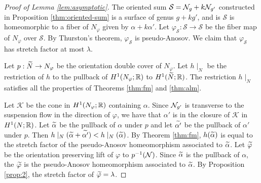 \begin{proof}[Proof of Lemma \ref{lem:asymptotic}]
The oriented sum $\mathcal{S}=\mathcal{N}_g+k\mathcal{N}_{g'}$ constructed in Proposition \ref{thm:oriented-sum} is a surface of genus $g+kg'$, and is $\mathcal{S}$ is homeomorphic to a fiber of $N_\varphi$ given by $\alpha+k\alpha'$.  Let $\varphi_{\mathcal{S}}:\mathcal{S}\rightarrow\mathcal{S}$ be the fiber map of $N_\varphi$ over $\mathcal{S}$.  By Thurston's theorem, $\varphi_{\mathcal{S}}$ is pseudo-Anosov.  We claim that $\varphi_{\mathcal{S}}$ has stretch factor at most $\lambda$.

Let $p:\widetilde{N}\rightarrow N_\varphi$ be the orientation double cover of $N_\varphi$. Let $h\mid_{N}$ be the restriction of $h$ to the pullback of $H^1(N_\varphi; \mathbb{R})$ to $H^1(\widetilde{N}; \mathbb{R})$.
The restriction $h\mid_N$ satisfies all the properties of Theorems \ref{thm:fm} and \ref{thm:alm}.

Let $\mathcal{K}$ be the cone in $H^1(N_\varphi;\mathbb{R})$ containing $\alpha$.  Since $\mathcal{N}_{g'}$ is transverse to the suspension flow in the direction of $\varphi$, we have that $\alpha'$ is in the closure of $\mathcal{K}$ in $H^1(N;\mathbb{R})$.  Let $\widetilde{\alpha}$ be the pullback of $\alpha$ under $p$ and let $\widetilde{\alpha'}$ be the pullback of $\alpha'$ under $p$.  Then $h\mid_N(\widetilde{\alpha}+\widetilde{\alpha'})<h\mid_N(\widetilde{\alpha})$.  By Theorem \ref{thm:fm}, $h(\widetilde{\alpha})$ is equal to the stretch factor of the pseudo-Anosov homeomorphism associated to $\widetilde{\alpha}$. Let $\widetilde{\varphi}$ be the orientation preserving lift of $\varphi$ to $p^{-1}(\mathcal{N})$.  Since $\widetilde{\alpha}$ is the pullback of $\alpha$, the $\widetilde{\varphi}$ is the pseudo-Anosov homeomorphism associated to $\widetilde{\alpha}$.  By Proposition \ref{prop:2}, the stretch factor of $\widetilde{\varphi}=\lambda$.
\end{proof}

